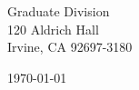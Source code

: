 \begin{minipage}{0.49\textwidth}
\begin{flushleft}
\noindent 
Graduate Division \\
120 Aldrich Hall\\
Irvine, CA 92697-3180
\end{flushleft}
\end{minipage}
\begin{minipage}{0.47\textwidth}
\begin{flushright}
\today
\end{flushright}
\end{minipage} \\

\newcommand{\univ}{University of California, Irvine}
\newcommand{\univshort}{UCI}
\newcommand{\degree}{Ph.D.}
\newcommand{\dept}{Computer Science}
